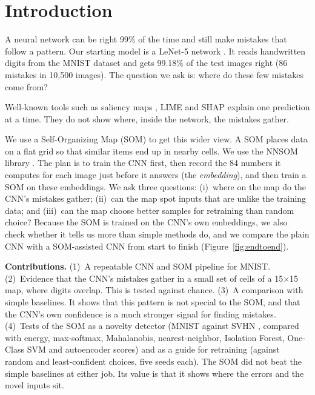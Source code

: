 \documentclass[11pt]{article}
\begin{document}
\section{Introduction}

A neural network can be right 99\% of the time and still make mistakes that follow a pattern. Our starting model is a LeNet-5 network \parencite{lecun1998gradient}. It reads handwritten digits from the MNIST dataset and gets 99.18\% of the test images right (86 mistakes in 10,500 images).
The question we ask is: where do these few mistakes come from?

Well-known tools such as saliency maps \parencite{simonyan2014saliency}, LIME \parencite{ribeiro2016lime} and SHAP \parencite{lundberg2017shap} explain one prediction at a time.
They do not show where, inside the network, the mistakes gather.

We use a Self-Organizing Map (SOM) \parencite{kohonen1990som} to get this wider view. A SOM places data on a flat grid so that similar items end up in nearby cells. We use the NNSOM library \parencite{jafari_nnsom}.
The plan is to train the CNN first, then record the 84 numbers it computes for each image just before it answers (the \emph{embedding}), and then train a SOM on these embeddings. We ask three questions:
(i)~where on the map do the CNN's mistakes gather; (ii)~can the map spot inputs that are unlike the training data; and (iii)~can the map choose better samples for retraining than random choice?
Because the SOM is trained on the CNN's own embeddings, we also check whether it tells us more than simple methods do, and we compare the plain CNN with a SOM-assisted CNN from start to finish (Figure~\ref{fig:endtoend}).

\textbf{Contributions.}
(1)~A repeatable CNN and SOM pipeline for MNIST.
(2)~Evidence that the CNN's mistakes gather in a small set of cells of a 15$\times$15 map, where digits overlap. This is tested against chance.
(3)~A comparison with simple baselines. It shows that this pattern is not special to the SOM, and that the CNN's own confidence is a much stronger signal for finding mistakes.
(4)~Tests of the SOM as a novelty detector (MNIST against SVHN \parencite{netzer2011reading}, compared with energy, max-softmax, Mahalanobis, nearest-neighbor, Isolation Forest, One-Class SVM and autoencoder scores) and as a guide for retraining (against random and least-confident choices, five seeds each). The SOM did not beat the simple baselines at either job. Its value is that it shows where the errors and the novel inputs sit.
\end{document}
